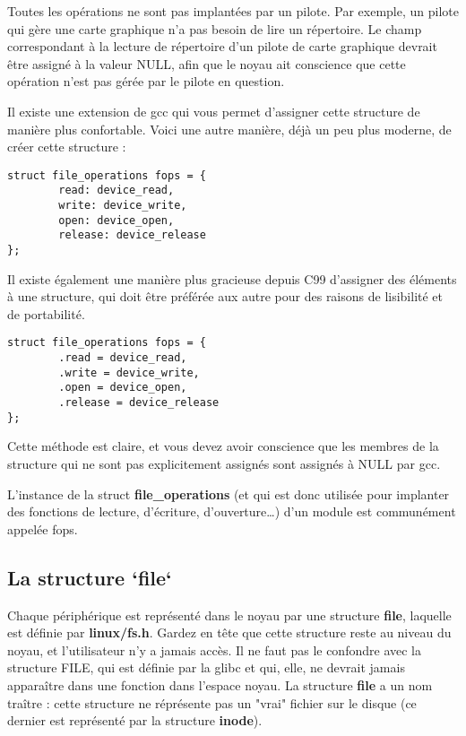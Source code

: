 \documentclass[11pt]{article}
\begin{document}
Toutes les opérations ne sont pas implantées par un pilote. Par exemple, un pilote qui gère une carte graphique n'a pas besoin de lire un répertoire. Le champ correspondant à la lecture de répertoire d'un pilote de carte graphique devrait être assigné à la valeur NULL, afin que le noyau ait conscience que cette opération n'est pas gérée par le pilote en question.

Il existe une extension de gcc qui vous permet d'assigner cette structure de manière plus confortable. Voici une autre manière, déjà un peu plus moderne, de créer cette structure :

\begin{verbatim}
struct file_operations fops = {
        read: device_read,
        write: device_write,
        open: device_open,
        release: device_release
};
\end{verbatim}

Il existe également une manière plus gracieuse depuis C99 d'assigner des éléments à une structure, qui doit être préférée aux autre pour des raisons de lisibilité et de portabilité.

\begin{verbatim}
struct file_operations fops = {
        .read = device_read,
        .write = device_write,
        .open = device_open,
        .release = device_release
};
\end{verbatim}

Cette méthode est claire, et vous devez avoir conscience que les membres de la structure qui ne sont pas explicitement assignés sont assignés à NULL par gcc.

L'instance de la struct \textbf{file\_operations} (et qui est donc utilisée pour implanter des fonctions de lecture, d'écriture, d'ouverture\ldots{}) d'un module est communément appelée fops.

\subsection*{La structure `file`}
\label{sec-6-2}

Chaque périphérique est représenté dans le noyau par une structure \textbf{file}, laquelle est définie par \textbf{linux/fs.h}. Gardez en tête que cette structure reste au niveau du noyau, et l'utilisateur n'y a jamais accès. Il ne faut pas le confondre avec la structure FILE, qui est définie par la glibc et qui, elle, ne devrait jamais apparaître dans une fonction dans l'espace noyau. La structure \textbf{file} a un nom traître : cette structure ne réprésente pas un "vrai" fichier sur le disque (ce dernier est représenté par la structure \textbf{inode}).
\end{document}
